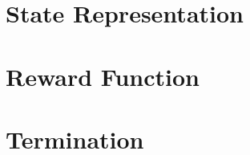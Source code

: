 \section{State Representation}\label{sec:environment-state-representation}


\section{Reward Function}\label{sec:environment-reward-function}


\section{Termination}\label{sec:environment-termination}
